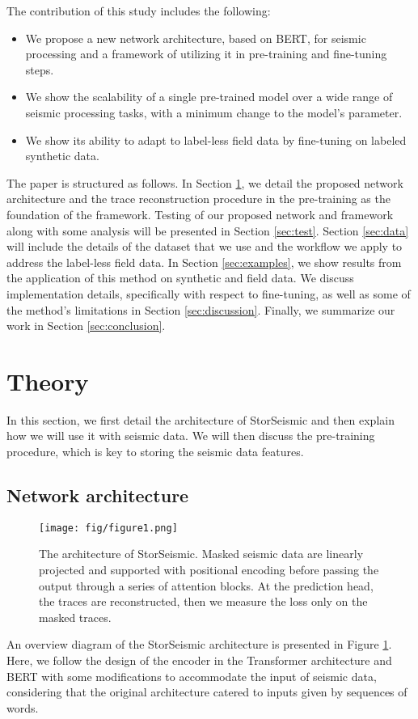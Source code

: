 \documentclass{article}
\begin{document}
The contribution of this study includes the following:
\begin{itemize}
    \item We propose a new network architecture, based on BERT, for seismic processing and a framework of utilizing it in pre-training and fine-tuning steps.
    \item We show the scalability of a single pre-trained model over a wide range of seismic processing tasks, with a minimum change to the model's parameter.
    \item We show its ability to adapt to label-less field data by fine-tuning on labeled synthetic data.
\end{itemize}

The paper is structured as follows. In Section \ref{sec:theory}, we detail the proposed network architecture and the trace reconstruction procedure in the pre-training as the foundation of the framework. Testing of our proposed network and framework along with some analysis will be presented in Section \ref{sec:test}. Section \ref{sec:data} will include the details of the dataset that we use and the workflow we apply to address the label-less field data. In Section \ref{sec:examples}, we show results from the application of this method on synthetic and field data. We discuss implementation details, specifically with respect to fine-tuning, as well as some of the method's limitations in Section \ref{sec:discussion}. Finally, we summarize our work in Section \ref{sec:conclusion}.

\section{Theory}
\label{sec:theory}
In this section, we first detail the architecture of StorSeismic and then explain how we will use it with seismic data. We will then discuss the pre-training procedure, which is key to storing the seismic data features.

\subsection{Network architecture}
\begin{figure}[h]
    \centering
    \texttt{[image: fig/figure1.png]}
    \caption{The architecture of StorSeismic. Masked seismic data are linearly projected and supported with positional encoding before passing the output through a series of attention blocks. At the prediction head, the traces are reconstructed, then we measure the loss only on the masked traces.}
    \label{fig:fig1}
\end{figure}
An overview diagram of the StorSeismic architecture is presented in Figure \ref{fig:fig1}. Here, we follow the design of the encoder in the Transformer architecture \cite{vaswani2017attention} and BERT \cite{devlin2018bert} with some modifications to accommodate the input of seismic data, considering that the original architecture catered to inputs given by sequences of words. 
\end{document}
